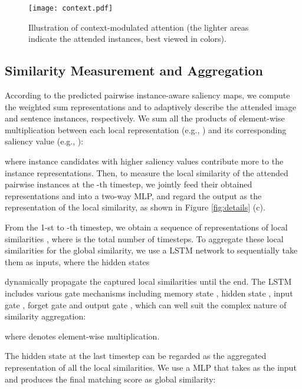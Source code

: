 \documentclass[10pt,twocolumn,letterpaper]{article}
\begin{document}
\begin{figure}[t]
\begin{center}
\texttt{[image: context.pdf]}
\end{center}
\caption{Illustration of context-modulated attention (the lighter areas indicate the attended instances, best
viewed in colors).}
\label{fig:context}
\end{figure}


\subsection{Similarity Measurement and Aggregation}





According to the predicted pairwise instance-aware saliency maps,
we compute the weighted sum representations  and 
to adaptively describe the attended image and sentence instances, respectively.
We sum all the products of element-wise multiplication
between each local representation (e.g., )
and its corresponding saliency value (e.g., ):

where instance candidates with higher saliency values
contribute more to the instance representations.
Then, to measure the local similarity of the attended pairwise instances at the -th timestep,
we jointly feed their obtained representations
 and  into a two-way MLP, and
regard the output  as the representation of the local similarity,
as shown in Figure \ref{fig:details} (c).




From the 1-st to -th timestep, we obtain a sequence of representations
of local similarities ,
where  is the total number of timesteps.
To aggregate these local similarities for the global similarity,
we use a LSTM network to sequentially take them as inputs,
where the hidden states

dynamically propagate the captured local similarities
until the end.
The LSTM includes various gate mechanisms including
memory state , hidden state ,
input gate , forget gate 
and output gate ,
which can well suit the complex nature of similarity aggregation:

where  denotes element-wise multiplication.

The hidden state at the last timestep 
can be regarded as the aggregated representation of all the local similarities.
We use a MLP that takes  as the input
and produces the final matching score  as global similarity:
\end{document}

